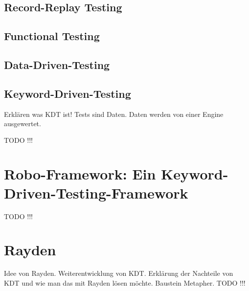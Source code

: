 \subsection{Record-Replay Testing}

\subsection{Functional Testing}

\subsection{Data-Driven-Testing}

\subsection{Keyword-Driven-Testing}

Erklären was KDT ist! 
Tests sind Daten.
Daten werden von einer Engine ausgewertet.

TODO !!!

\section{Robo-Framework: Ein Keyword-Driven-Testing-Framework}

TODO !!!

\section{Rayden}

Idee von Rayden. Weiterentwicklung von KDT.
Erklärung der Nachteile von KDT und wie man das mit Rayden lösen möchte.
Baustein Metapher.
TODO !!!

